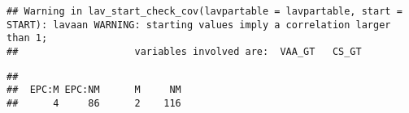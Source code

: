 \documentclass[
]{article}
\newenvironment{Shaded}{\begin{snugshade}}{\end{snugshade}}
\newcommand{\CommentTok}[1]{\textcolor[rgb]{0.56,0.35,0.01}{\textit{#1}}}
\newcommand{\KeywordTok}[1]{\textcolor[rgb]{0.13,0.29,0.53}{\textbf{#1}}}
\newcommand{\NormalTok}[1]{#1}
\newcommand{\OperatorTok}[1]{\textcolor[rgb]{0.81,0.36,0.00}{\textbf{#1}}}
\newcommand{\StringTok}[1]{\textcolor[rgb]{0.31,0.60,0.02}{#1}}
\begin{document}
\begin{verbatim}
## Warning in lav_start_check_cov(lavpartable = lavpartable, start = START): lavaan WARNING: starting values imply a correlation larger than 1;
##                    variables involved are:  VAA_GT   CS_GT
\end{verbatim}

\begin{Shaded}
\end{Shaded}

\begin{verbatim}
## 
##  EPC:M EPC:NM      M     NM 
##      4     86      2    116
\end{verbatim}
\end{document}
